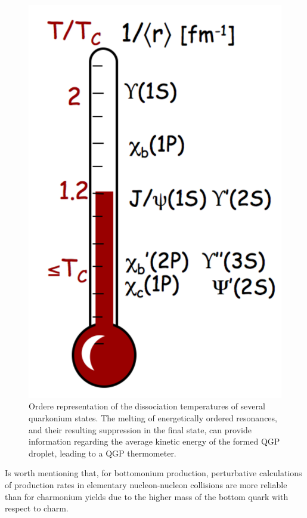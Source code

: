 

\begin{figure}[!t]
\begin{center}
\includegraphics[width=0.3\linewidth]{Chapters/Introduction/Figs/thermometer.pdf}
\caption{Ordere representation of the dissociation temperatures of several quarkonium states. The melting of energetically ordered resonances, and their resulting suppression in the final state, can provide information regarding the average kinetic energy of the formed QGP droplet, leading to a QGP thermometer.}
\label{fig:QGP_thermo}
\end{center}
\end{figure}

Is worth mentioning that, for bottomonium production, perturbative calculations of production rates in elementary nucleon-nucleon collisions are more reliable than for charmonium yields due to the higher mass of the bottom quark with respect to charm. 

